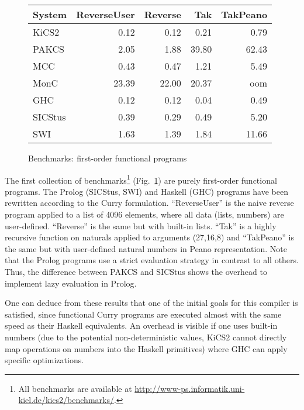 \documentclass{llncs}
\begin{document}
\begin{figure}
\centering
\begin{tabular}{|@{~~}l@{~~}|*{4}{@{~~}r@{~~}|}}
\hline
System  & ReverseUser & Reverse &  Tak  & TakPeano \\\hline
KiCS2   &      0.12   &   0.12  &  0.21 &    0.79  \\
PAKCS   &      2.05   &   1.88  & 39.80 &   62.43  \\
MCC     &      0.43   &   0.47  &  1.21 &    5.49  \\
MonC    &     23.39   &  22.00  & 20.37 &     oom  \\
GHC     &      0.12   &   0.12  &  0.04 &    0.49  \\
SICStus &      0.39   &   0.29  &  0.49 &    5.20  \\
SWI     &      1.63   &   1.39  &  1.84 &   11.66  \\
\hline
\end{tabular}
\caption{Benchmarks: first-order functional programs}
 \label{fig:bench-first-order}
\end{figure}
%
The first collection of benchmarks\footnote{All benchmarks are available
at \url{http://www-ps.informatik.uni-kiel.de/kics2/benchmarks/}.}
(Fig.~\ref{fig:bench-first-order})
are purely first-order functional programs.
The Prolog (SICStus, SWI) and Haskell (GHC) programs have been rewritten
according to the Curry formulation.
``ReverseUser'' is the naive reverse program applied to a list of 4096 elements,
where all data (lists, numbers) are user-defined.
``Reverse'' is the same but with built-in lists.
``Tak'' is a highly recursive function on naturals \cite{Partain93}
applied to arguments (27,16,8) and ``TakPeano'' is the same but with
user-defined natural numbers in Peano representation.
Note that the Prolog programs use a strict evaluation strategy
in contrast to all others. Thus, the difference between PAKCS and SICStus
shows the overhead to implement lazy evaluation in Prolog.

One can deduce from these results that one of the initial
goals for this compiler is satisfied, since functional Curry programs
are executed almost with the same speed as their Haskell equivalents.
An overhead is visible if one uses built-in numbers
(due to the potential non-deterministic values, KiCS2 cannot
directly map operations on numbers into the Haskell primitives)
where GHC can apply specific optimizations.
\end{document}
